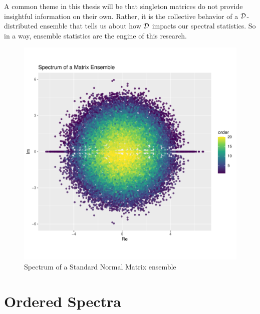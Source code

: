 A common theme in this thesis will be that singleton matrices do not provide insightful information on their own. Rather, it is the collective behavior of a $\mathcal{D}$-distributed ensemble that tells us about how $\mathcal{D}$ impacts our spectral statistics. So in a way, ensemble statistics are the engine of this research.

\begin{figure}[h]
 \begin{center}
  \includegraphics[scale = 0.7]{../graphics/chap2/2-1-2_normal_spec}
  \caption{Spectrum of a Standard Normal Matrix ensemble}
 \end{center}
 \label{spectrum_normal_ensemble_plot}
\end{figure}


\section{Ordered Spectra}

